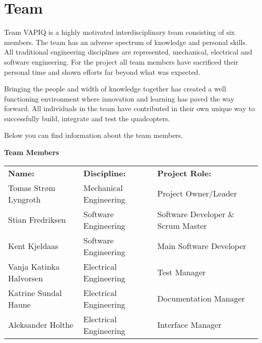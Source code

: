 \chapter{Team}

Team VAPIQ is a highly motivated interdisciplinary team consisting of six members. The team has an adverse spectrum of knowledge and personal skills. All traditional engineering disciplines are represented, mechanical, electrical and software engineering. For the project all team members have sacrificed their personal time and shown efforts far beyond what was expected. \bigskip

Bringing the people and width of knowledge together has created a well functioning environment where innovation and learning has paved the way forward. All individuals in the team have contributed in their own unique way to successfully build, integrate and test the quadcopters. \bigskip

Below you can find information about the team members. 

\begin{table}[H]
\begin{center}
\textbf{\Large Team Members}\\
\begin{tabular}{lll}
\rowcolor{cadetgrey}
\textbf{Name:}    &\textbf{Discipline:} 	 &\textbf{Project Role:}     \\
                           Tomas Strøm Lyngroth & Mechanical Engineering  & Project Owner/Leader \\ 
\rowcolor{gainsboro}       Stian Fredriksen & Software Engineering  & Software Developer \& Scrum Master \\ %
                           Kent Kjeldaas & Software Engineering & Main Software Developer \\ 
\rowcolor{gainsboro}       Vanja Katinka Halvorsen & Electrical Engineering  & Test Manager \\
                           Katrine Sundal Haune & Electrical Engineering & Documentation Manager \\ 
\rowcolor{gainsboro}       Aleksander Holthe & Electrical Engineering  & Interface Manager \\


\end{tabular} 
\end{center}
\end{table}

